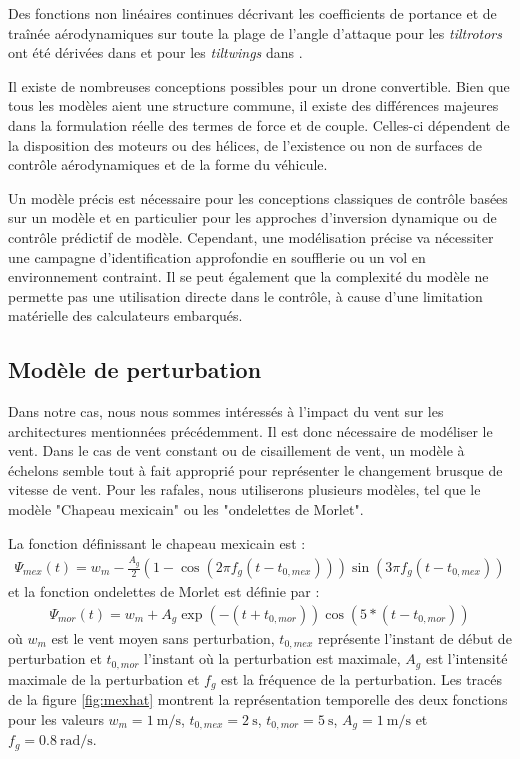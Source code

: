 Des fonctions non linéaires continues décrivant les coefficients de portance et de traînée aérodynamiques sur toute la plage de l'angle d'attaque pour les  \textit{tiltrotors} ont été dérivées dans \cite{6981467} et pour les \textit{tiltwings} dans \cite{Lustosa2017LaP, lustosaHal-03035938}.

Il existe de nombreuses conceptions possibles pour un drone convertible. Bien que tous les modèles aient une structure commune, il existe des différences majeures dans la formulation réelle des termes de force et de couple. Celles-ci dépendent de la disposition des moteurs ou des hélices, de l'existence ou non de surfaces de contrôle aérodynamiques et de la forme du véhicule.

Un modèle précis est nécessaire pour les conceptions classiques de contrôle basées sur un modèle et en particulier pour les approches d'inversion dynamique ou de contrôle prédictif de modèle. Cependant, une modélisation précise va nécessiter une campagne d'identification approfondie en soufflerie ou un vol en environnement contraint. Il se peut également que la complexité du modèle ne permette pas une utilisation directe dans le contrôle, à cause d'une limitation matérielle des calculateurs embarqués.

\subsection{Modèle de perturbation}
\label{sec:perturbation}
Dans notre cas, nous nous sommes intéressés à l'impact du vent sur les architectures mentionnées précédemment. Il est donc nécessaire de modéliser le vent. Dans le cas de vent constant ou de cisaillement de vent, un modèle à échelons semble tout à fait approprié pour représenter le changement brusque de vitesse de vent. 
Pour les rafales, nous utiliserons plusieurs modèles, tel que le modèle "Chapeau mexicain" ou les "ondelettes de Morlet".

La fonction définissant le chapeau mexicain est :
\begin{align}
    \label{eq:mex}
    \Psi_{mex}(t)= w_{m} - \frac{A_g}{2} \left(1-\cos(2 \pi f_g (t-t_{0,mex}))\right)\sin(3 \pi f_g (t-t_{0,mex}))
\end{align}
et la fonction ondelettes de Morlet est définie par :
\begin{align}
    \label{eq:morlet}
    \Psi_{mor}(t)=  w_{m} + A_g \exp(-(t+t_{0,mor})) \cos(5*(t-t_{0,mor}))
\end{align}
où $w_{m}$ est le vent moyen sans perturbation, $t_{0,mex}$ représente l'instant de début de perturbation et $t_{0,mor}$ l'instant où la perturbation est maximale, $A_g$ est l'intensité maximale de la perturbation et  $f_g$ est la fréquence de la perturbation. Les tracés de la figure \ref{fig:mexhat} montrent la représentation temporelle des deux fonctions pour les valeurs $w_{m} = \SI{1}{\meter\per\second}$, $t_{0,mex} = \SI{2}{\second}$,  $t_{0,mor} = \SI{5}{\second}$, $A_g = \SI{1}{\meter\per\second}$ et $f_g = \SI{0.8}{\radian\per\second}$.


